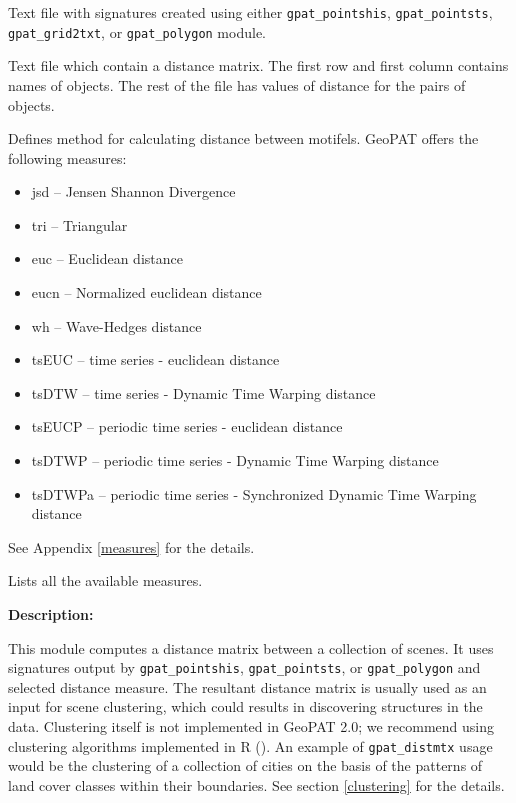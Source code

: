 
Text file with signatures created using either {\tt gpat\_pointshis}, {\tt gpat\_pointsts}, {\tt gpat\_grid2txt}, or {\tt gpat\_polygon} module.


Text file which contain a distance matrix.
The first row and first column contains names of objects. 
The rest of the file has values of distance for the pairs of objects.


Defines method for calculating distance between motifels. 
GeoPAT offers the following measures: 
\begin{itemize}
	\item jsd -- Jensen Shannon Divergence
	\item tri -- Triangular
	\item euc -- Euclidean distance
	\item eucn -- Normalized euclidean distance
	\item wh -- Wave-Hedges distance
	\item tsEUC -- time series - euclidean distance
	\item tsDTW -- time series - Dynamic Time Warping distance
	\item tsEUCP -- periodic time series - euclidean distance
	\item tsDTWP -- periodic time series - Dynamic Time Warping distance
	\item tsDTWPa -- periodic time series - Synchronized Dynamic Time Warping distance
\end{itemize}
See Appendix \ref{measures} for the details.


Lists all the available measures.


{\bf Description:}

This module computes a distance matrix between a collection of scenes. 
It uses signatures output by {\tt gpat\_pointshis}, {\tt gpat\_pointsts}, or {\tt gpat\_polygon} and selected distance measure.
The resultant distance matrix is usually used as an input for scene clustering, which could results in discovering structures in the data.
Clustering itself is not implemented in GeoPAT 2.0; we recommend using clustering algorithms implemented in R (\cite{R}).
An example of {\tt gpat\_distmtx} usage would be the clustering of a collection of cities on the basis of the patterns of land cover classes within their boundaries.
See section \ref{clustering} for the details.

